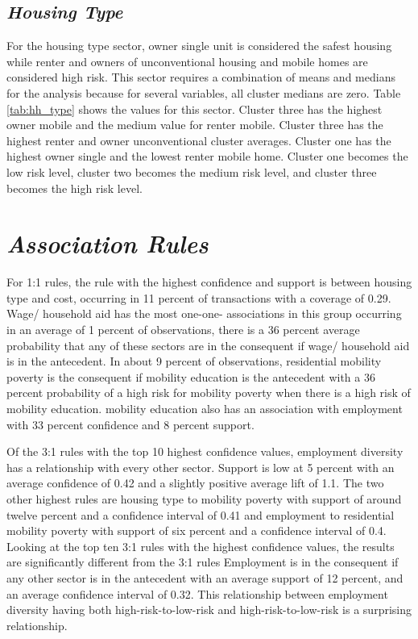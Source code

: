 \subsection{\textit{Housing Type}}
For the housing type sector, owner single unit is considered the safest housing while renter and owners of unconventional housing and mobile homes are considered high risk. This sector requires a combination of means and medians for the analysis because for several variables, all cluster medians are zero. Table \ref{tab:hh_type} shows the values for this sector. Cluster three has the highest owner mobile and the medium value for renter mobile. Cluster three has the highest renter and owner unconventional cluster averages. Cluster one has the highest owner single and the lowest renter mobile home. Cluster one becomes the low risk level, cluster two becomes the medium risk level, and cluster three becomes the high risk level.




\section{\textit{Association Rules}}
For 1:1 rules, the rule with the highest confidence and support is between housing type and cost, occurring in 11 percent of transactions with a coverage of 0.29. Wage/ household aid has the most one-one- associations in this group occurring in an average of 1 percent of observations, there is a 36 percent average probability that any of these sectors are in the consequent if wage/ household aid is in the antecedent. In about 9 percent of observations, residential mobility poverty is the consequent if mobility education is the antecedent with a 36 percent probability of a high risk for mobility poverty when there is a high risk of mobility education. mobility education also has an association with employment with 33 percent confidence and 8 percent support. 

Of the 3:1 rules with the top 10 highest confidence values, employment diversity has a relationship with every other sector. Support is low at 5 percent with an average confidence of 0.42 and a slightly positive average lift of 1.1. The two other highest rules are housing type to mobility poverty with support of around twelve percent and a confidence interval of 0.41 and employment to residential mobility poverty with support of six percent and a confidence interval of 0.4. Looking at the top ten 3:1 rules with the highest confidence values, the results are significantly different from the 3:1 rules Employment is in the consequent if any other sector is in the antecedent with an average support of 12 percent, and an average confidence interval of 0.32. This relationship between employment diversity having both high-risk-to-low-risk and high-risk-to-low-risk is a surprising relationship. 

